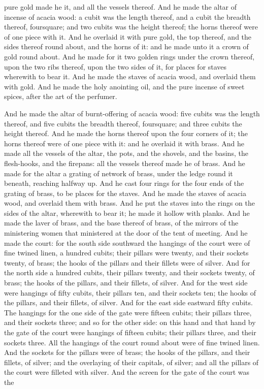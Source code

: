pure gold made he it, and all the vessels thereof.  And he made the altar of incense of acacia wood: a cubit was the length thereof, and a cubit the breadth thereof, foursquare; and two cubits was the height thereof; the horns thereof were of one piece with it. And he overlaid it with pure gold, the top thereof, and the sides thereof round about, and the horns of it: and he made unto it a crown of gold round about. And he made for it two golden rings under the crown thereof, upon the two ribs thereof, upon the two sides of it, for places for staves wherewith to bear it. And he made the staves of acacia wood, and overlaid them with gold. And he made the holy anointing oil, and the pure incense of sweet spices, after the art of the perfumer. 

And he made the altar of burnt-offering of acacia wood: five cubits was the length thereof, and five cubits the breadth thereof, foursquare; and three cubits the height thereof. And he made the horns thereof upon the four corners of it; the horns thereof were of one piece with it: and he overlaid it with brass. And he made all the vessels of the altar, the pots, and the shovels, and the basins, the flesh-hooks, and the firepans: all the vessels thereof made he of brass. And he made for the altar a grating of network of brass, under the ledge round it beneath, reaching halfway up. And he cast four rings for the four ends of the grating of brass, to be places for the staves. And he made the staves of acacia wood, and overlaid them with brass. And he put the staves into the rings on the sides of the altar, wherewith to bear it; he made it hollow with planks.  And he made the laver of brass, and the base thereof of brass, of the mirrors of the ministering women that ministered at the door of the tent of meeting.  And he made the court: for the south side southward the hangings of the court were of fine twined linen, a hundred cubits; their pillars were twenty, and their sockets twenty, of brass; the hooks of the pillars and their fillets were of silver. And for the north side a hundred cubits, their pillars twenty, and their sockets twenty, of brass; the hooks of the pillars, and their fillets, of silver. And for the west side were hangings of fifty cubits, their pillars ten, and their sockets ten; the hooks of the pillars, and their fillets, of silver. And for the east side eastward fifty cubits. The hangings for the one side of the gate were fifteen cubits; their pillars three, and their sockets three; and so for the other side: on this hand and that hand by the gate of the court were hangings of fifteen cubits; their pillars three, and their sockets three. All the hangings of the court round about were of fine twined linen. And the sockets for the pillars were of brass; the hooks of the pillars, and their fillets, of silver; and the overlaying of their capitals, of silver; and all the pillars of the court were filleted with silver. And the screen for the gate of the court was the 